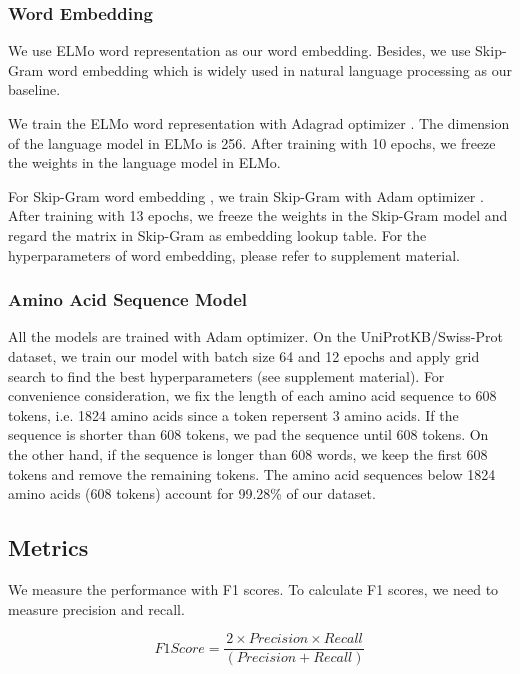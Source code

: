 \documentclass{article}
\begin{document}
        \subsubsection{Word Embedding}
            We use ELMo word representation as our word embedding. Besides, we use Skip-Gram word embedding which is widely used in natural language processing as our baseline. \par
            We train the ELMo word representation with Adagrad optimizer \cite{duchi2011adaptive}. The dimension of the language model in ELMo is 256. After training with 10 epochs, we freeze the weights in the language model in ELMo.\par
            For Skip-Gram word embedding \citep{NIPS2013_5021}, we train Skip-Gram with Adam optimizer \cite{journals/corr/KingmaB14}. After training with 13 epochs, we freeze the weights in the Skip-Gram model and regard the matrix in Skip-Gram as embedding lookup table. For the hyperparameters of word embedding, please refer to supplement material.

        \subsubsection{Amino Acid Sequence Model}
            All the models are trained with Adam optimizer. On the UniProtKB/Swiss-Prot dataset, we train our model with batch size 64 and 12 epochs and apply grid search to find the best hyperparameters (see supplement material). For convenience consideration, we fix the length of each amino acid sequence to 608 tokens, i.e. 1824 amino acids since a token repersent 3 amino acids. If the sequence is shorter than 608 tokens, we pad the sequence until 608 tokens. On the other hand, if the sequence is longer than 608 words, we keep the first 608 tokens and remove the remaining tokens. The amino acid sequences below 1824 amino acids (608 tokens) account for 99.28\% of our dataset.

    \subsection{Metrics}
        We measure the performance with F1 scores. To calculate F1 scores, we need to measure precision and recall. 

        \begin{equation}
        F1   Score = \frac{2 \times Precision \times Recall}{(Precision + Recall)}
        \end{equation}
\end{document}

